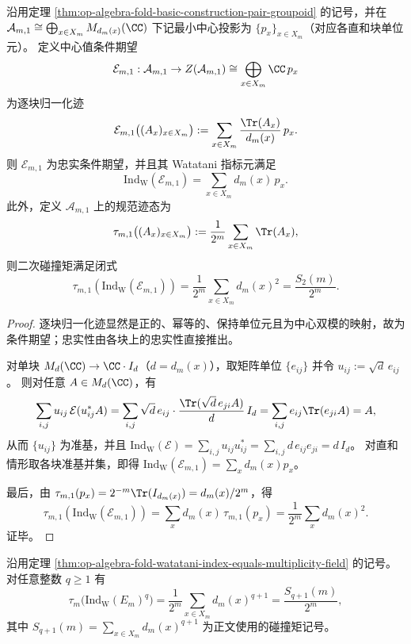 

\begin{theorem}[中心值条件期望与二次碰撞矩]\label{thm:op-algebra-fold-center-expectation-index-collision2}
沿用定理 \ref{thm:op-algebra-fold-basic-construction-pair-groupoid} 的记号，并在 \(\mathcal A_{m,1}\cong\bigoplus_{x\in X_m}M_{d_m(x)}(\CC)\) 下记最小中心投影为 \(\{p_x\}_{x\in X_m}\)（对应各直和块单位元）。
定义中心值条件期望
\[
\mathcal E_{m,1}:\mathcal A_{m,1}\to Z(\mathcal A_{m,1})\cong \bigoplus_{x\in X_m}\CC\,p_x
\]
为逐块归一化迹
\[
\mathcal E_{m,1}\bigl((A_x)_{x\in X_m}\bigr)
:=\sum_{x\in X_m}\frac{\Tr(A_x)}{d_m(x)}\,p_x.
\]
则 \(\mathcal E_{m,1}\) 为忠实条件期望，并且其 Watatani 指标元满足
\[
\mathrm{Ind}_{\mathrm W}(\mathcal E_{m,1})
=\sum_{x\in X_m} d_m(x)\,p_x.
\]
此外，定义 \(\mathcal A_{m,1}\) 上的规范迹态为
\[
\tau_{m,1}\bigl((A_x)_{x\in X_m}\bigr):=\frac{1}{2^m}\sum_{x\in X_m}\Tr(A_x),
\]
则二次碰撞矩满足闭式
\[
\tau_{m,1}\!\left(\mathrm{Ind}_{\mathrm W}(\mathcal E_{m,1})\right)=\frac{1}{2^m}\sum_{x\in X_m}d_m(x)^2=\frac{S_2(m)}{2^m}.
\]
\end{theorem}
\begin{proof}
逐块归一化迹显然是正的、幂等的、保持单位元且为中心双模的映射，故为条件期望；忠实性由各块上的忠实性直接推出。
\par
对单块 \(M_d(\CC)\to \CC\cdot I_d\)（\(d=d_m(x)\)），取矩阵单位 \(\{e_{ij}\}\) 并令
\(
u_{ij}:=\sqrt d\,e_{ij}
\)。
则对任意 \(A\in M_d(\CC)\)，有
\[
\sum_{i,j} u_{ij}\,\mathcal E(u_{ij}^\ast A)
=\sum_{i,j}\sqrt d\,e_{ij}\cdot \frac{\Tr(\sqrt d\,e_{ji}A)}{d}\,I_d
=\sum_{i,j} e_{ij}\Tr(e_{ji}A)
=A,
\]
从而 \(\{u_{ij}\}\) 为准基，并且
\(
\mathrm{Ind}_{\mathrm W}(\mathcal E)=\sum_{i,j}u_{ij}u_{ij}^\ast
=\sum_{i,j} d\,e_{ij}e_{ji}
=d\,I_d
\)。
对直和情形取各块准基并集，即得
\(
\mathrm{Ind}_{\mathrm W}(\mathcal E_{m,1})=\sum_x d_m(x)p_x
\)。
\par
最后，由 \(\tau_{m,1}(p_x)=2^{-m}\Tr(I_{d_m(x)})=d_m(x)/2^m\)，得
\[
\tau_{m,1}\!\left(\mathrm{Ind}_{\mathrm W}(\mathcal E_{m,1})\right)
=\sum_x d_m(x)\,\tau_{m,1}(p_x)
=\frac{1}{2^m}\sum_x d_m(x)^2.
\]
证毕。
\end{proof}

\begin{corollary}\label{cor:op-algebra-fold-watatani-index-moments}
沿用定理 \ref{thm:op-algebra-fold-watatani-index-equals-multiplicity-field} 的记号。
对任意整数 \(q\ge 1\) 有
\[
\tau_m\!\bigl(\mathrm{Ind}_{\mathrm{W}}(E_m)^q\bigr)
=\frac{1}{2^m}\sum_{x\in X_m} d_m(x)^{q+1}
=\frac{S_{q+1}(m)}{2^m},
\]
其中 \(S_{q+1}(m)=\sum_{x\in X_m}d_m(x)^{q+1}\) 为正文使用的碰撞矩记号。
\end{corollary}

